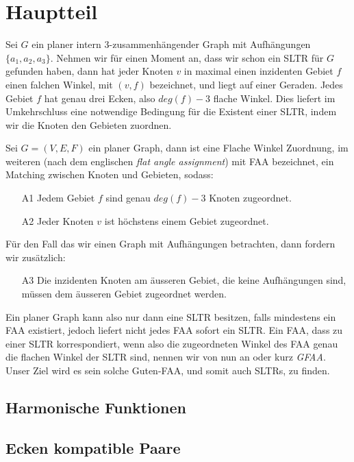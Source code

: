 \chapter{Hauptteil}

Sei $G$ ein planer intern 3-zusammenhängender Graph mit Aufhängungen $\{a_1,a_2,a_3\}$. Nehmen wir für einen Moment an, dass wir schon ein SLTR für $G$ gefunden haben, dann hat jeder Knoten $v$ in maximal einen inzidenten Gebiet $f$ einen falchen Winkel, mit $(v,f)$ bezeichnet, und liegt auf einer Geraden. Jedes Gebiet $f$ hat genau drei Ecken, also $deg(f)-3$ flache Winkel. Dies liefert im Umkehrschluss eine notwendige Bedingung für die Existent einer SLTR, indem wir die Knoten den Gebieten zuordnen.

\begin{definition}[FAA]
Sei $G=(V,E,F)$ ein planer Graph, dann ist eine Flache Winkel Zuordnung, im weiteren (nach dem englischen \textit{flat angle assignment}) mit FAA bezeichnet, ein Matching zwischen Knoten und Gebieten, sodass:
\begin{itemize}
\item [A1] Jedem Gebiet $f$ sind genau $deg(f)-3$ Knoten zugeordnet.
\item [A2] Jeder Knoten $v$ ist höchstens einem Gebiet zugeordnet.
\end{itemize}
Für den Fall das wir einen Graph mit Aufhängungen betrachten, dann fordern wir zusätzlich:
\begin{itemize}
\item [A3] Die inzidenten Knoten am äusseren Gebiet, die keine Aufhängungen sind, müssen dem äusseren Gebiet zugeordnet werden.
\end{itemize}
\end{definition}


Ein planer Graph kann also nur dann eine SLTR besitzen, falls mindestens ein FAA existiert, jedoch liefert nicht jedes FAA sofort ein SLTR. Ein FAA, dass zu einer SLTR korrespondiert, wenn also die zugeordneten Winkel des FAA genau die flachen Winkel der SLTR sind, nennen wir von nun an  oder kurz \textit{GFAA}. Unser Ziel wird es sein solche Guten-FAA, und somit auch SLTRs, zu finden.

\section{Harmonische Funktionen}


\section{Ecken kompatible Paare}